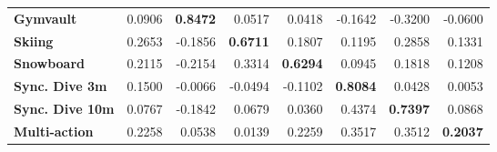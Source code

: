 \documentclass[10pt,twocolumn,letterpaper]{article}
\begin{document}
\begin{table*}[t]
\begin{tabular}{l|rrrrrr|r}
\textbf{Gymvault}       & 0.0906                               & \textbf{0.8472}                                                                   & 0.0517                               & 0.0418                                                                              & -0.1642                                                                               & -0.3200                                                           & -0.0600                                                      \\ 
\textbf{Skiing}         & 0.2653                               & -0.1856                                                                            & \textbf{0.6711}                               & 0.1807                                                                              & 0.1195                                                                                & 0.2858                                                            & 0.1331                                                       \\ 
\textbf{Snowboard}      & 0.2115                               & -0.2154                                                                            & 0.3314                               & \textbf{0.6294} & 0.0945                                                                                & 0.1818                                                            & 0.1208                                                       \\ 
\textbf{Sync. Dive 3m}  & 0.1500                               & -0.0066                                                                            & -0.0494                              & -0.1102                                                                             & \textbf{0.8084} & 0.0428                                                            & 0.0053                                                       \\ 
\textbf{Sync. Dive 10m} & 0.0767                               & -0.1842                                                                            & 0.0679                               & 0.0360                                                                              & 0.4374                                                                                & \textbf{0.7397}                                                            & 0.0868                                                       \\ \midrule 
\textbf{Multi-action}                                                      & 0.2258                               & 0.0538                                                                             & 0.0139                               & 0.2259                                                                              & 0.3517                                                                                & 0.3512                                                            & \textbf{0.2037}                                              \\ \bottomrule

\end{tabular}
\end{table*}
\end{document}
